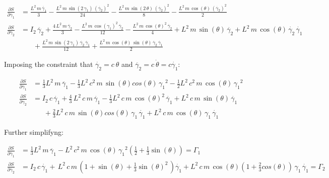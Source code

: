 \documentclass[12pt, letterpaper]{../assignment}
\begin{document}
\begin{equation*}
  \begin{aligned}
    \frac{\partial S}{\partial \ddot{\gamma_1}} &= \frac{L^2\,m\,\ddot{\gamma_1}}{3}-\frac{L^2\,m\,\sin\left(2\,\gamma _{1}\right)\,{\left(\dot{\gamma_2}\right)}^2}{24}-\frac{L^2\,m\,\sin\left(2\,\theta \right)\,{\left(\dot{\gamma_2}\right)}^2}{8}-\frac{L^2\,m\,\cos\left(\theta \right)\,{\left(\dot{\gamma_2}\right)}^2}{2} \\
    \frac{\partial S}{\partial \ddot{\gamma_2}} &= I_{2}\,\ddot{\gamma_2}+\frac{4\,L^2\,m\,\ddot{\gamma_2}}{3}-\frac{L^2\,m\,{\cos\left(\gamma _{1}\right)}^2\,\ddot{\gamma_2}}{12}-\frac{L^2\,m\,{\cos\left(\theta \right)}^2\,\ddot{\gamma_2}}{4}+L^2\,m\,\sin\left(\theta \right)\,\ddot{\gamma_2}+L^2\,m\,\cos\left(\theta \right)\,\dot{\gamma_2}\,\dot{\gamma_1}\\
    &\ \ \ \ \ \ \ \ +\frac{L^2\,m\,\sin\left(2\,\gamma _{1}\right)\,\dot{\gamma_2}\,\dot{\gamma_1}}{12}+\frac{L^2\,m\,\cos\left(\theta \right)\,\sin\left(\theta \right)\,\dot{\gamma_2}\,\dot{\gamma_1}}{2}
  \end{aligned}
\end{equation*}

Imposing the constraint that $\dot{\gamma_2} = c\ \theta $ and $\ddot{\gamma_2} = c\ \dot{\theta} = c \dot{\gamma_1} $:

\begin{equation*}
  \begin{aligned}
    \frac{\partial S}{\partial \ddot{\gamma_1}} &= \frac{1}{3}L^2\,m\,\ddot{\gamma_1}-\frac{1}{3}L^2\,c^2\,m\,\sin\left(\theta \right)cos\left(\theta \right)\,{\gamma _{1}}^2-\frac{1}{2}L^2\,c^2\,m\,\cos\left(\theta \right)\,{\gamma _{1}}^2 \\
    \frac{\partial S}{\partial \ddot{\gamma_2}} &= I_{2}\,c\,\dot{\gamma_1}+\frac{4}{3}\,L^2\,c\,m\,\dot{\gamma_1}-\frac{1}{3}L^2\,c\,m\,{\cos\left(\theta \right)}^2\,\dot{\gamma_1}+L^2\,c\,m\,\sin\left(\theta \right)\,\dot{\gamma_1}\\
    & \ \ \ \ \ \ \ +\frac{2}{3} L^2\,c\,m\,\sin\left(\theta \right)cos\left(\theta \right)\,\gamma _{1}\,\dot{\gamma_1}+L^2\,c\,m\,\cos\left(\theta \right)\,\gamma _{1}\,\dot{\gamma_1}
  \end{aligned}
\end{equation*}

Further simplifyng:

\begin{equation*}
  \begin{aligned}
    \frac{\partial S}{\partial \ddot{\gamma_1}} &= \frac{1}{3}L^2\,m\,\ddot{\gamma_1}-L^2\,c^2\,m\,\cos\left(\theta \right)\,{\gamma _{1}}^2\left(\frac{1}{2}+\frac{1}{3}\sin\left(\theta \right) \right) = \Gamma_1\\
    \frac{\partial S}{\partial \ddot{\gamma_2}} &= I_{2}\,c\,\dot{\gamma_1}+\,L^2\,c\,m\,\left(1+\sin\left(\theta \right)+\frac{1}{3}{\sin\left(\theta \right)}^2\,\right)\dot{\gamma_1}
    + L^2\,c\,m\,\cos\left(\theta \right)\left(1+\frac{2}{3} cos\left(\theta \right)\right)\,\gamma _{1}\,\dot{\gamma_1} = \Gamma_2
  \end{aligned}
\end{equation*}
\end{document}
